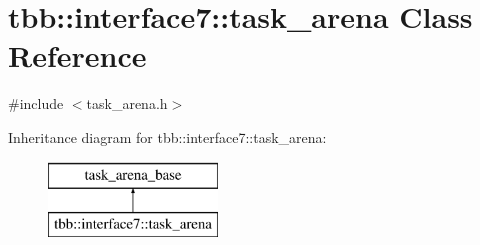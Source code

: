 \hypertarget{classtbb_1_1interface7_1_1task__arena}{}\section{tbb\+:\+:interface7\+:\+:task\+\_\+arena Class Reference}
\label{classtbb_1_1interface7_1_1task__arena}


{\ttfamily \#include $<$task\+\_\+arena.\+h$>$}

Inheritance diagram for tbb\+:\+:interface7\+:\+:task\+\_\+arena\+:\begin{figure}[H]
\begin{center}
\leavevmode
\includegraphics[height=2.000000cm]{classtbb_1_1interface7_1_1task__arena}
\end{center}
\end{figure}
